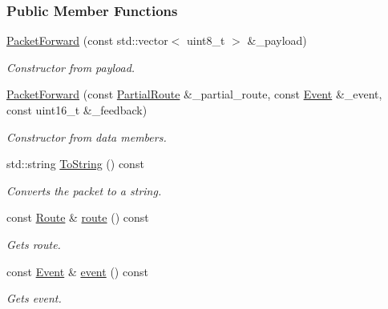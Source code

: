 \subsubsection*{Public Member Functions}
\begin{DoxyCompactItemize}
\item 
\hyperlink{classosse_1_1collaborate_1_1_packet_forward_aa9d4d7abe36998c9178db59950c18c51}{Packet\+Forward} (const std\+::vector$<$ uint8\+\_\+t $>$ \&\+\_\+payload)
\begin{DoxyCompactList}\small\item\em Constructor from payload. \end{DoxyCompactList}\item 
\hyperlink{classosse_1_1collaborate_1_1_packet_forward_a1b033de632232702fdc6c4b58b747b73}{Packet\+Forward} (const \hyperlink{classosse_1_1collaborate_1_1_packet_forward_a4627beb1294e822a7eec6038969a5da0}{Partial\+Route} \&\+\_\+partial\+\_\+route, const \hyperlink{classosse_1_1collaborate_1_1_packet_forward_a66c37a806c4b486cb1af64409865fa4b}{Event} \&\+\_\+event, const uint16\+\_\+t \&\+\_\+feedback)
\begin{DoxyCompactList}\small\item\em Constructor from data members. \end{DoxyCompactList}\item 
std\+::string \hyperlink{classosse_1_1collaborate_1_1_packet_forward_ab1bc40a24079aac6e1ee579e76b6e4a3}{To\+String} () const
\begin{DoxyCompactList}\small\item\em Converts the packet to a string. \end{DoxyCompactList}\item 
const \hyperlink{classosse_1_1collaborate_1_1_packet_forward_a5b42a7c3605c5a6c7e0880599b213240}{Route} \& \hyperlink{classosse_1_1collaborate_1_1_packet_forward_a186c0e8f307fb9495533e4abc977b86b}{route} () const
\begin{DoxyCompactList}\small\item\em Gets route. \end{DoxyCompactList}\item 
const \hyperlink{classosse_1_1collaborate_1_1_packet_forward_a66c37a806c4b486cb1af64409865fa4b}{Event} \& \hyperlink{classosse_1_1collaborate_1_1_packet_forward_a6807359ebbff9386a42e8310493cccc3}{event} () const
\begin{DoxyCompactList}\small\item\em Gets event. \end{DoxyCompactList}\item 

\end{DoxyCompactItemize}
